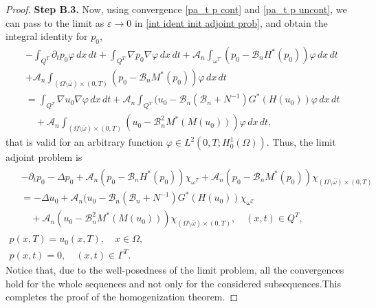 \documentclass[reqno]{amsart}
\begin{document}
\begin{proof}
\noindent\textbf{Step B.3.}
Now, using convergence \eqref{pa_t p cont} and 
\eqref{pa_t p uncont}, we can pass to the limit as $\varepsilon \to 0$ 
in \eqref{int ident init adjoint prob}, and obtain the integral identity for $p_0$,
\begin{equation}
\begin{aligned}
&-\int _{Q^{T}}\partial _{t}p_0\varphi \,dx\,dt+\int _{Q^{T}}%
\nabla p_0\nabla \varphi \,dx\,dt
+\mathcal{A}_n\int _{\omega ^{T}}(p_0-\mathcal{B}_nH^{\ast
}(p_0))\varphi \,dx\,dt \\
&+\mathcal{A}_n\int _{(\Omega \setminus
\overline{\omega })\times (0,T)}(p_0-\mathcal{B}_nM^{\ast
}(p_0))\varphi \,dx\,dt    \\
&=\int _{Q^{T}}\nabla u_0\nabla \varphi \,dx\,dt+\mathcal{A}%
_n\int _{Q^{T}}(u_0-\mathcal{B}_n(\mathcal{B}_n+N^{-1})G^{\ast
}(H(u_0))\varphi \,dx\,dt    \\
&\quad +\mathcal{A}_n\int _{(\Omega \setminus \overline{\omega })\times
(0,T)}(u_0-\mathcal{B}_n^2M^{\ast }(M(u_0)))\varphi \,dx\,dt,
\end{aligned} \label{p_0 int ident}
\end{equation}
that is valid for an arbitrary function $\varphi \in L^2(0,T;H_0^{1}(\Omega ))$.
Thus, the limit adjoint problem is
\begin{equation}
\begin{gathered}
\begin{aligned}
&-\partial _{t}p_0-\Delta p_0
+\mathcal{A}_n(p_0-\mathcal{B}_nH^{\ast }(p_0))\chi _{\omega ^{T}}+%
\mathcal{A}_n(p_0-\mathcal{B}_nM^{\ast }(p_0))\chi _{(\Omega
\setminus \overline{\omega })\times (0,T)}   \\
&=-\Delta u_0+\mathcal{A}_n(u_0-\mathcal{B}_n(\mathcal{B}%
_n+N^{-1})G^{\ast }(H(u_0))\chi _{\omega ^{T}}  \\
&\quad +\mathcal{A}_n(u_0-\mathcal{B}_n^2M^{\ast }(M(u_0)))\chi _{(\Omega
\setminus \overline{\omega })\times (0,T)}, \quad (x,t)\in Q^{T},
\end{aligned} \\
p(x,T)=u_0(x,T), \quad x\in \Omega , \\
p(x,t)=0, \quad (x,t)\in \Gamma ^{T}.%
\end{gathered}   \label{p_0 limit prob}
\end{equation}
Notice that, due to the well-posedness of the limit problem, all the
convergences hold for the whole sequences and not only for the considered
subsequences.This completes the proof of the homogenization theorem.
\end{proof}
\end{document}
